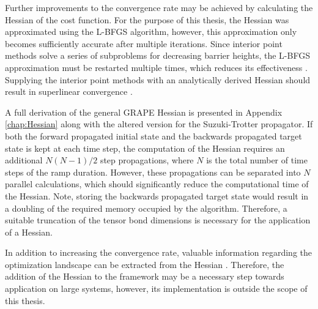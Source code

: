 Further improvements to the convergence rate may be achieved by calculating the Hessian of the cost function. For the purpose of this thesis, the Hessian was approximated using the L-BFGS algorithm, however, this approximation only becomes sufficiently accurate after multiple iterations. Since interior point methods solve a series of subproblems for decreasing barrier heights, the L-BFGS approximation must be restarted multiple times, which reduces its effectiveness \cite{Wachter2006}. Supplying the interior point methods with an analytically derived Hessian should result in superlinear convergence \cite{wright}.

A full derivation of the general GRAPE Hessian is presented in Appendix \ref{chap:Hessian} along with the altered version for the Suzuki-Trotter propagator. If both the forward propagated initial state and the backwards propagated target state is kept at each time step, the computation of the Hessian requires an additional $N(N - 1)/2$ step propagations, where $N$ is the total number of time steps of the ramp duration. However, these propagations can be separated into $N$ parallel calculations, which should significantly reduce the computational time of the Hessian. Note, storing the backwards propagated target state would result in a doubling of the required memory occupied by the algorithm. Therefore, a suitable truncation of the tensor bond dimensions is necessary for the application of a Hessian.

In addition to increasing the convergence rate, valuable information regarding the optimization landscape can be extracted from the Hessian \cite{Shen2006}. Therefore, the addition of the Hessian to the framework may be a necessary step towards application on large systems, however, its implementation is outside the scope of this thesis.


